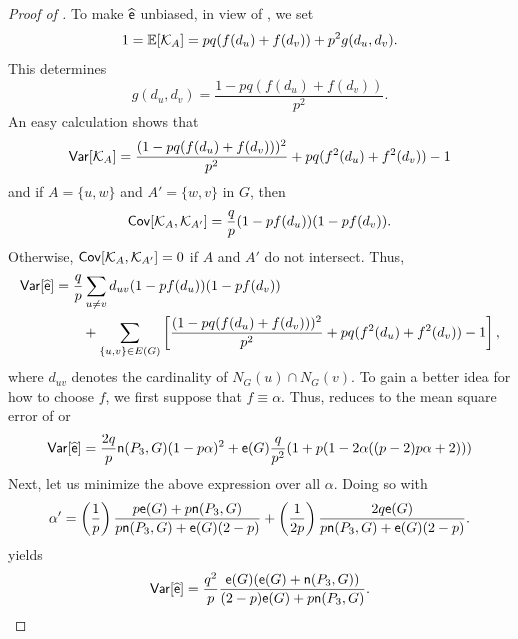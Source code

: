 \begin{proof}[Proof of ]
To make $ \widehat{{\mathsf{e}}} $ unbiased, in view of , we set
\begin{equation*}
1 = \mathbb{E} [\mathcal{K}_{A}] = pq(f(d_{u}) + f(d_{v}))+ p^2g(d_{u},d_{v}).
\end{equation*}
This determines
\begin{equation*}
g(d_{u},d_{v}) = \frac{1-pq(f(d_{u}) + f(d_{v}))}{p^2}.
\end{equation*}
An easy calculation shows that
\begin{equation*}
\mathsf{Var}[\mathcal{K}_{A}] = \frac{(1-pq(f(d_{u}) + f(d_{v})))^2}{p^2} + pq(f^2(d_{u}) + f^2(d_{v})) - 1
\end{equation*}
and if $ A = \{u, w\} $ and $ A' = \{w, v\} $ in $ G $, then
\begin{equation*}
\mathsf{Cov}[\mathcal{K}_{A}, \mathcal{K}_{A'}] = \frac{q}{p}(1-pf(d_{u}))(1-pf(d_{v})).
\end{equation*}
Otherwise, $\mathsf{Cov}[\mathcal{K}_{A}, \mathcal{K}_{A'}] = 0$ if $ A $ and $ A' $ do not intersect.
Thus,
\begin{align}
\mathsf{Var}[\widehat{{\mathsf{e}}}] & = \frac{q}{p}\sum_{u \neq v}d_{u v}(1-pf(d_{u}))(1-pf(d_{v})) \nonumber \\ & \qquad  +\sum_{\{u, v\} \in E(G) } \left[\frac{(1-pq(f(d_{u}) + f(d_{v})))^2}{p^2} + pq(f^2(d_{u}) + f^2(d_{v})) - 1\right], \label{eq:risk}
\end{align}
where $ d_{u v} $ denotes the cardinality of $ N_G(u) \cap N_G(v) $.
To gain a better idea for how to choose $ f $, we first suppose that $ f \equiv \alpha $.
Thus,  reduces to the mean square error of  or
\begin{equation*}
\mathsf{Var}[\widehat{{\mathsf{e}}}] = \frac{2q}{p}\mathsf{n}(P_3, G)(1-p\alpha)^2+ {\mathsf{e}}(G)\frac{q}{p^2}(1+p(1-2\alpha((p-2)p\alpha+2)))
\end{equation*}
Next, let us minimize the above expression over all $ \alpha $. Doing so with 
\begin{equation*}
\alpha' = \left( \frac{1}{p}\right)\frac{p{\mathsf{e}}(G)+p\mathsf{n}(P_3, G)}{p\mathsf{n}(P_3, G)+{\mathsf{e}}(G)(2-p)} + \left( \frac{1}{2p}\right)\frac{2q{\mathsf{e}}(G)}{p\mathsf{n}(P_3, G)+{\mathsf{e}}(G)(2-p)}.
\end{equation*}
yields
\begin{equation} \label{eq:minimum}
\mathsf{Var}[\widehat{{\mathsf{e}}}] = \frac{q^2}{p}\frac{{\mathsf{e}}(G)({\mathsf{e}}(G)+\mathsf{n}(P_3, G))}{(2-p){\mathsf{e}}(G)+p\mathsf{n}(P_3, G)}.
\end{equation}

\end{proof}
